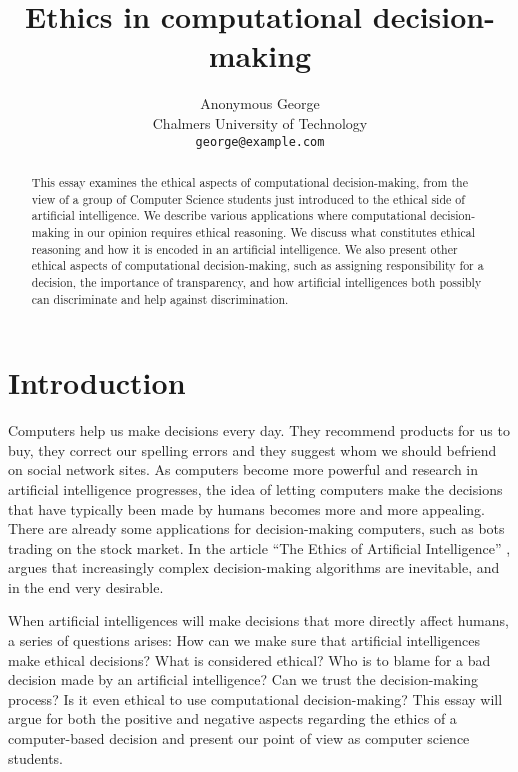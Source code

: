\documentclass[11pt]{article}
\title{Ethics in computational decision-making}
\author{Anonymous George \\
  Chalmers University of Technology \\
  {\tt george@example.com}
}
\date{}
\begin{document}
\maketitle

\begin{abstract}
  This essay examines the ethical aspects of computational decision-making, 
  from the view of a group of Computer Science students just introduced to 
  the ethical side of artificial intelligence. We describe various applications 
  where computational decision-making in our opinion requires ethical reasoning.
  We discuss what constitutes ethical reasoning and how it is encoded in an 
  artificial intelligence. We also present other ethical aspects of 
  computational decision-making, such as assigning responsibility for a decision,
  the importance of transparency, and how artificial intelligences both possibly
  can discriminate and help against discrimination.
\end{abstract}

\section{Introduction}
Computers help us make decisions every day. They recommend products for us to
buy, they correct our spelling errors and they suggest whom we should befriend
on social network sites. As computers become more powerful and research in artificial 
intelligence progresses, the idea of letting computers make the decisions that have 
typically been made by humans becomes more and more appealing. There are already some 
applications for decision-making computers, such as bots trading on the stock market. 
In the article ``The Ethics of Artificial Intelligence'' \citeyear{bostrom2013ethics}, 
\citeauthor{bostrom2013ethics} argues that increasingly complex decision-making 
algorithms are inevitable, and in the end very desirable. 

When artificial intelligences will make decisions that more directly affect humans, a series of questions
arises: How can we make sure that artificial intelligences make ethical decisions? What is considered ethical? 
Who is to blame for a bad decision made by an artificial intelligence? Can we trust the decision-making 
process? Is it even ethical to use computational decision-making? This essay will argue for both the positive 
and negative aspects regarding the ethics of a computer-based decision and present our point of view as 
computer science students.
\end{document}
